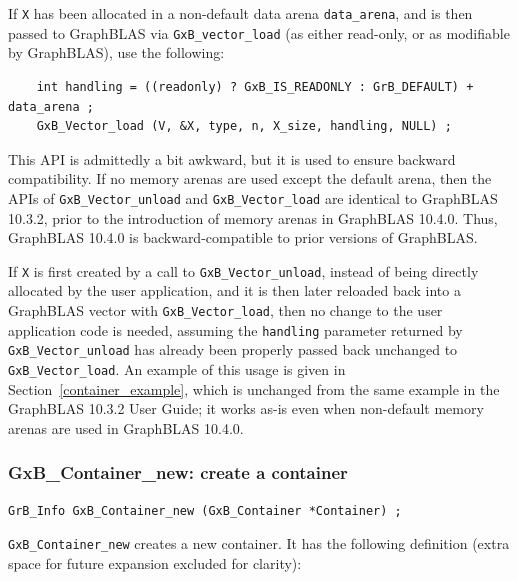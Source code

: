 If \verb'X' has been allocated in a non-default data arena \verb'data_arena',
and is then passed to GraphBLAS via \verb'GxB_vector_load' (as either
read-only, or as modifiable by GraphBLAS), use the following:

{\footnotesize
\begin{verbatim}
    int handling = ((readonly) ? GxB_IS_READONLY : GrB_DEFAULT) + data_arena ;
    GxB_Vector_load (V, &X, type, n, X_size, handling, NULL) ; \end{verbatim}}

This API is admittedly a bit awkward, but it is used to ensure backward
compatibility.  If no memory arenas are used except the default arena, then the
APIs of \verb'GxB_Vector_unload' and \verb'GxB_Vector_load' are identical to
GraphBLAS 10.3.2, prior to the introduction of memory arenas in GraphBLAS
10.4.0.  Thus, GraphBLAS 10.4.0 is backward-compatible to prior versions of
GraphBLAS.

If \verb'X' is first created by a call to \verb'GxB_Vector_unload', instead of
being directly allocated by the user application, and it is then later reloaded
back into a GraphBLAS vector with \verb'GxB_Vector_load', then no change to the
user application code is needed, assuming the \verb'handling' parameter
returned by \verb'GxB_Vector_unload' has already been properly passed back
unchanged to \verb'GxB_Vector_load'.  An example of this usage is given in
Section~\ref{container_example}, which is unchanged from the same example in
the GraphBLAS 10.3.2 User Guide; it works as-is even when non-default memory
arenas are used in GraphBLAS 10.4.0.

\newpage
\subsubsection{{\sf GxB\_Container\_new:} create a container}
\label{container_new}

\begin{mdframed}[userdefinedwidth=6in]
{\footnotesize
\begin{verbatim}
GrB_Info GxB_Container_new (GxB_Container *Container) ;
\end{verbatim}
} \end{mdframed}

\verb'GxB_Container_new' creates a new container.  It has the following
definition (extra space for future expansion excluded for clarity):


